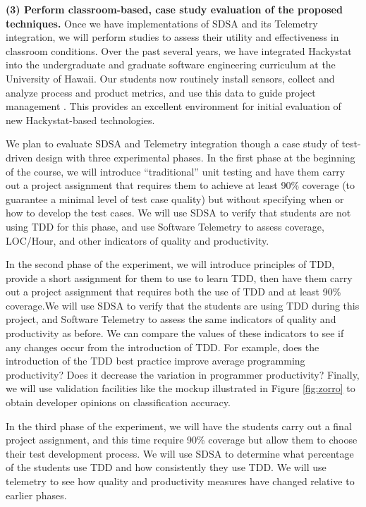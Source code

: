 {\bf (3) Perform classroom-based, case study evaluation of the proposed
techniques.}  Once we have implementations of SDSA and its Telemetry
integration, we will perform studies to assess their utility and
effectiveness in classroom conditions.  Over the past several years, we
have integrated Hackystat into the undergraduate and graduate software
engineering curriculum at the University of Hawaii. Our students now
routinely install sensors, collect and analyze process and product metrics,
and use this data to guide project management \cite{csdl2-03-12}.  This
provides an excellent environment for initial evaluation of new Hackystat-based
technologies.

We plan to evaluate SDSA and Telemetry integration though a case study of
test-driven design with three experimental phases.  In the first phase at
the beginning of the course, we will introduce ``traditional'' unit testing
and have them carry out a project assignment that requires them to achieve
at least 90\% coverage (to guarantee a minimal level of test case quality)
but without specifying when or how to develop the test cases.  We will use
SDSA to verify that students are not using TDD for this phase, and use
Software Telemetry to assess coverage, LOC/Hour, and other indicators of
quality and productivity.

In the second phase of the experiment, we will introduce principles of TDD,
provide a short assignment for them to use to learn TDD, then have them
carry out a project assignment that requires both the use of TDD and at
least 90\% coverage.We will use SDSA to verify that the students are using
TDD during this project, and Software Telemetry to assess the same
indicators of quality and productivity as before.  We can compare the
values of these indicators to see if any changes occur from the
introduction of TDD. For example, does the introduction of the TDD best
practice improve average programming productivity?  Does it decrease the
variation in programmer productivity?  Finally, we will use validation facilities 
like the mockup illustrated in Figure \ref{fig:zorro} to obtain developer opinions
on classification accuracy. 

In the third phase of the experiment, we will have the students carry out a
final project assignment, and this time require 90\% coverage but allow
them to choose their test development process.  We will use SDSA to
determine what percentage of the students use TDD and how consistently they
use TDD. We will use telemetry to see how quality and productivity measures
have changed relative to earlier phases.

